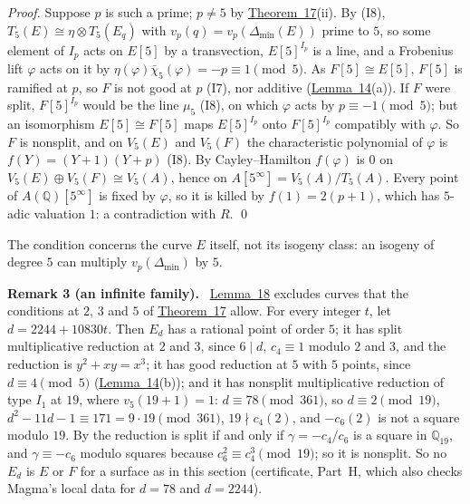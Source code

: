 \documentclass[11pt]{article}
\newenvironment{statement}[1]{\par\medskip\noindent\phantomsection\textbf{#1}\ }{\par\medskip}
\newcommand{\Q}{\mathbb Q}
\begin{document}
\emph{Proof.} Suppose \(p\) is such a prime; \(p\neq5\) by \hyperref[thm-25]{Theorem~17}(ii). By (I8),
\(T_5(E)\cong\eta\otimes T_5(E_q)\) with \(v_p(q)=v_p(\Delta_{\min}(E))\) prime to \(5\), so some element of \(I_p\)
acts on \(E[5]\) by a transvection, \(E[5]^{I_p}\) is a line, and a Frobenius lift \(\varphi\) acts on it by
\(\eta(\varphi)\bar\chi_5(\varphi)=-p\equiv1\pmod5\). As \(F[5]\cong E[5]\), \(F[5]\) is ramified at \(p\), so \(F\) is
not good at \(p\) (I7), nor additive (\hyperref[lemma-five]{Lemma~14}(a)). If \(F\) were split, \(F[5]^{I_p}\) would
be the line \(\mu_5\) (I8), on which \(\varphi\) acts by \(p\equiv-1\pmod5\); but an isomorphism \(E[5]\cong F[5]\)
maps \(E[5]^{I_p}\) onto \(F[5]^{I_p}\) compatibly with \(\varphi\). So \(F\) is nonsplit, and on \(V_5(E)\) and
\(V_5(F)\) the characteristic polynomial of \(\varphi\) is \(f(Y)=(Y+1)(Y+p)\) (I8). By Cayley--Hamilton \(f(\varphi)\)
is \(0\) on \(V_5(E)\oplus V_5(F)\cong V_5(A)\), hence on \(A[5^\infty]=V_5(A)/T_5(A)\). Every point of
\(A(\Q)[5^\infty]\) is fixed by \(\varphi\), so it is killed by \(f(1)=2(p+1)\), which has \(5\)-adic valuation
\(1\): a contradiction with \(R\). \qed

\medskip
The condition concerns the curve \(E\) itself, not its isogeny class: an isogeny of degree \(5\) can multiply
\(v_p(\Delta_{\min})\) by \(5\).

\begin{statement}{Remark 3 (an infinite family).}\label{rem-family}
\hyperref[lemma-nonsplit]{Lemma~18} excludes curves that the conditions at \(2\), \(3\) and \(5\) of
\hyperref[thm-25]{Theorem~17} allow. For every integer \(t\), let \(d=2244+10830t\). Then \(E_d\) has a rational point
of order \(5\); it has split multiplicative reduction at \(2\) and \(3\), since \(6\mid d\), \(c_4\equiv1\) modulo
\(2\) and \(3\), and the reduction is \(y^2+xy=x^3\); it has good reduction at \(5\) with \(5\) points, since
\(d\equiv4\pmod5\) (\hyperref[lemma-five]{Lemma~14}(b)); and it has nonsplit multiplicative reduction of type
\(I_1\) at \(19\), where \(v_5(19+1)=1\): \(d\equiv78\pmod{361}\), so \(d\equiv2\pmod{19}\),
\(d^2-11d-1\equiv171=9\cdot19\pmod{361}\), \(19\nmid c_4(2)\), and \(-c_6(2)\) is not a square modulo \(19\). By
\cite[Lemma~V.5.2 and Theorem~V.5.3]{Si2} the reduction is split if and only if \(\gamma=-c_4/c_6\) is a square in
\(\Q_{19}\), and \(\gamma\equiv-c_6\) modulo squares because \(c_6^2\equiv c_4^3\pmod{19}\); so it is nonsplit. So no \(E_d\) is \(E\) or \(F\) for a surface as in this section (certificate, Part~H, which
also checks Magma's local data for \(d=78\) and \(d=2244\)).
\end{statement}
\end{document}
